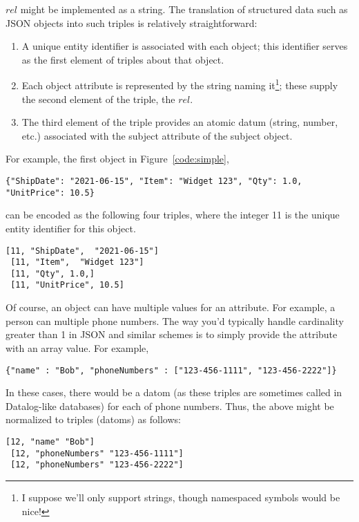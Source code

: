 \documentclass[9pt,letterpaper]{article}
\newcommand{\stt}[1]{\begin{footnotesize}\texttt{#1}\end{footnotesize}}
\begin{document}
$rel$ might be implemented as a string.
The translation of structured data such as JSON objects into such triples is relatively straightforward:
\begin{enumerate}
\item A unique entity identifier is associated with each object; this identifier serves as the first element of triples about that object.
\item Each object attribute is represented by the string naming it\footnote{I suppose we'll only support strings, though namespaced symbols would be nice!}; these supply the second element of the triple, the $rel$.
\item The third element of the triple provides an atomic datum (string, number, etc.) associated with the subject attribute of the subject object.
\end{enumerate}

For example, the first object in Figure~\ref{code:simple}, \stt{\{"ShipDate":  "2021-06-15", "Item":  "Widget 123", "Qty": 1.0, "UnitPrice": 10.5\}} can be encoded as
the following four triples, where the integer 11 is the unique entity identifier for this object.

\begin{lstlisting}[basicstyle=\ttfamily\scriptsize]
 [11, "ShipDate",  "2021-06-15"]
 [11, "Item",  "Widget 123"] 
 [11, "Qty", 1.0,]
 [11, "UnitPrice", 10.5]
\end{lstlisting}

Of course, an object can have multiple values for an attribute.
For example, a person can multiple phone numbers.
The way you'd typically handle cardinality greater than 1 in JSON and similar schemes is to simply provide the attribute with an array value.
For example,

\begin{lstlisting}[basicstyle=\ttfamily\scriptsize]
 {"name" : "Bob", "phoneNumbers" : ["123-456-1111", "123-456-2222"]}
\end{lstlisting}

In these cases, there would be a datom (as these triples are sometimes called in Datalog-like databases) for each of phone numbers.
Thus, the above might be normalized to triples (datoms) as follows:

\begin{lstlisting}[basicstyle=\ttfamily\scriptsize]
 [12, "name" "Bob"]
 [12, "phoneNumbers" "123-456-1111"]
 [12, "phoneNumbers" "123-456-2222"]
\end{lstlisting}
\end{document}
